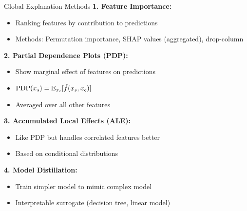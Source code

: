\documentclass[aspectratio=169]{beamer}
\begin{document}
\begin{frame}{Global Explanation Methods}
  \textbf{1. Feature Importance:}
  \begin{itemize}
    \item Ranking features by contribution to predictions
    \item Methods: Permutation importance, SHAP values (aggregated), drop-column
  \end{itemize}

  \vspace{0.5em}

  \textbf{2. Partial Dependence Plots (PDP):}
  \begin{itemize}
    \item Show marginal effect of features on predictions
    \item $\text{PDP}(x_s) = \mathbb{E}_{x_c}[\hat{f}(x_s, x_c)]$
    \item Averaged over all other features
  \end{itemize}

  \vspace{0.5em}

  \textbf{3. Accumulated Local Effects (ALE):}
  \begin{itemize}
    \item Like PDP but handles correlated features better
    \item Based on conditional distributions
  \end{itemize}

  \vspace{0.5em}

  \textbf{4. Model Distillation:}
  \begin{itemize}
    \item Train simpler model to mimic complex model
    \item Interpretable surrogate (decision tree, linear model)
  \end{itemize}
\end{frame}
\end{document}
